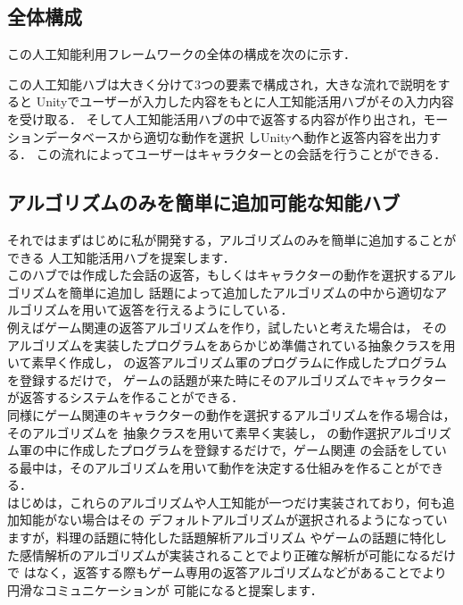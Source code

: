 \subsection{全体構成}
この人工知能利用フレームワークの全体の構成を次のに示す．


この人工知能ハブは大きく分けて3つの要素で構成され，大きな流れで説明をすると
Unityでユーザーが入力した内容をもとに人工知能活用ハブがその入力内容を受け取る．
そして人工知能活用ハブの中で返答する内容が作り出され，モーションデータベースから適切な動作を選択
しUnityへ動作と返答内容を出力する．
この流れによってユーザーはキャラクターとの会話を行うことができる．
\subsection{アルゴリズムのみを簡単に追加可能な知能ハブ}
それではまずはじめに私が開発する，アルゴリズムのみを簡単に追加することができる
人工知能活用ハブを提案します．\\

このハブでは作成した会話の返答，もしくはキャラクターの動作を選択するアルゴリズムを簡単に追加し
話題によって追加したアルゴリズムの中から適切なアルゴリズムを用いて返答を行えるようにしている．\\

例えばゲーム関連の返答アルゴリズムを作り，試したいと考えた場合は，
そのアルゴリズムを実装したプログラムをあらかじめ準備されている抽象クラスを用いて素早く作成し，
の返答アルゴリズム軍のプログラムに作成したプログラムを登録するだけで，
ゲームの話題が来た時にそのアルゴリズムでキャラクターが返答するシステムを作ることができる．\\

同様にゲーム関連のキャラクターの動作を選択するアルゴリズムを作る場合は，そのアルゴリズムを
抽象クラスを用いて素早く実装し，
の動作選択アルゴリズム軍の中に作成したプログラムを登録するだけで，ゲーム関連
の会話をしている最中は，そのアルゴリズムを用いて動作を決定する仕組みを作ることができる．\\

はじめは，これらのアルゴリズムや人工知能が一つだけ実装されており，何も追加知能がない場合はその
デフォルトアルゴリズムが選択されるようになっていますが，料理の話題に特化した話題解析アルゴリズム
やゲームの話題に特化した感情解析のアルゴリズムが実装されることでより正確な解析が可能になるだけで
はなく，返答する際もゲーム専用の返答アルゴリズムなどがあることでより円滑なコミュニケーションが
可能になると提案します．

